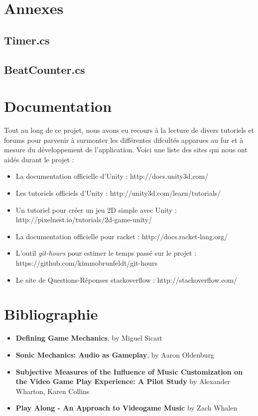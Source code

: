 \chapter{Annexes}

\section*{Timer.cs}

\section*{BeatCounter.cs}


\newpage

\chapter{Documentation}
Tout au long de ce projet, nous avons eu recours à la lecture de divers tutoriels et forums pour parvenir à surmonter les différentes difcultés apparues au fur et à mesure du développement de l’application.
Voici une liste des sites qui nous ont aidés durant le projet :
\begin{itemize}
\item La documentation officielle d'Unity : http://docs.unity3d.com/
\item Les tutoriels officiels d'Unity : http://unity3d.com/learn/tutorials/
\item Un tutoriel pour créer un jeu 2D simple avec Unity : http://pixelnest.io/tutorials/2d-game-unity/
\item La documentation officielle pour racket : http://docs.racket-lang.org/
\item L'outil \textit{git-hours} pour estimer le temps passé sur le projet :  https://github.com/kimmobrunfeldt/git-hours
\item Le site de Questions-Réponses stackoverflow : http://stackoverflow.com/
\end{itemize}

\chapter{Bibliographie}
\begin{itemize}
\item \textbf{Defining Game Mechanics}, by Miguel Sicart
\item \textbf{Sonic Mechanics: Audio as Gameplay}, by Aaron Oldenburg 
\item \textbf{Subjective Measures of the Influence of Music Customization on the Video Game Play Experience: A Pilot Study} by Alexander Wharton, Karen Collins
\item \textbf{Play Along - An Approach to Videogame Music} by Zach Whalen
\end{itemize}
